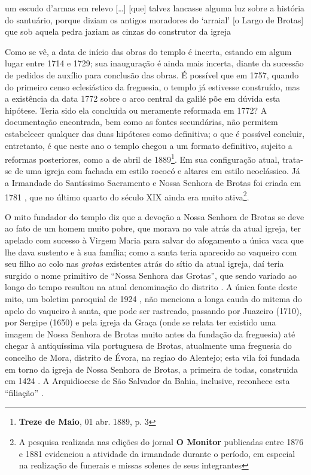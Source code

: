 \begin{citacao}
um escudo d'armas em relevo [\dots] [que] talvez lancasse alguma luz sobre a história do santuário, porque diziam os antigos moradores do `arraial' [o Largo de Brotas] que sob aquela pedra jaziam as cinzas do construtor da igreja \cite[p.~88]{campos_brotas_1942}
\end{citacao}

Como se vê, a data de início das obras do templo é incerta, estando em algum lugar entre 1714 e 1729; sua inauguração é ainda mais incerta, diante da sucessão de pedidos de auxílio para conclusão das obras. É possível que em 1757, quando do primeiro censo eclesiástico da freguesia, o templo já estivesse construído, mas a existência da data 1772 sobre o arco central da galilé põe em dúvida esta hipótese. Teria sido ela concluída ou meramente reformada em 1772? A documentação encontrada, bem como as fontes secundárias, não permitem estabelecer qualquer das duas hipóteses como definitiva; o que é possível concluir, entretanto, é que neste ano o templo chegou a um formato definitivo, sujeito a reformas posteriores, como a de abril de 1889\footnote{\textbf{Treze de Maio}, 01 abr. 1889, p. 3}. Em sua configuração atual, trata-se de uma igreja com fachada em estilo rococó e altares em estilo neoclássico. Já a Irmandade do Santíssimo Sacramento e Nossa Senhora de Brotas foi criada em 1781 \cite[p.~172]{VASCONCELOS2002}, que no último quarto do século XIX ainda era muito ativa\footnote{A pesquisa realizada nas edições do jornal \textbf{O Monitor} publicadas entre 1876 e 1881 evidenciou a atividade da irmandade durante o período, em especial na realização de funerais e missas solenes de seus integrantes}.

O mito fundador do templo diz que a devoção a Nossa Senhora de Brotas se deve ao fato de um homem muito pobre, que morava no vale atrás da atual igreja, ter apelado com sucesso à Virgem Maria para salvar do afogamento a única vaca que lhe dava sustento e à sua família; como a santa teria aparecido ao vaqueiro com seu filho ao colo nas \textit{grotas} existentes atrás do sítio da atual igreja, daí teria surgido o nome primitivo de ``Nossa Senhora das Grotas'', que sendo variado ao longo do tempo resultou na atual denominação do distrito \cite{campos_brotas_1942,texbar_capellas_1930}. A única fonte deste mito, um boletim paroquial de 1924 \cite[p.~345]{texbar_capellas_1930}, não menciona a longa cauda do mitema do apelo do vaqueiro à santa, que pode ser rastreado, passando por Juazeiro (1710), por Sergipe (1650) e pela igreja da Graça (onde se relata ter existido uma imagem de Nossa Senhora de Brotas muito antes da fundação da freguesia) \cite[p.~89-92]{campos_brotas_1942} até chegar à antiquíssima vila portuguesa de Brotas, atualmente uma freguesia do concelho de Mora, distrito de Évora, na regiao do Alentejo; esta vila foi fundada em torno da igreja de Nossa Senhora de Brotas, a primeira de todas, construida em 1424 \cite{campos_brotas_1942, correia_brotas_2010}. A Arquidiocese de São Salvador da Bahia, inclusive, reconhece esta ``filiação'' \cite{arqui_brotas_2015}.

